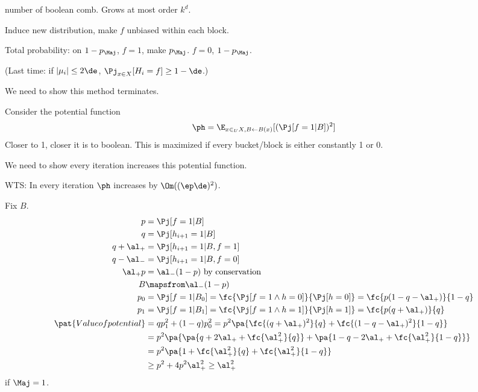number of boolean comb. Grows at most order $k^d$.

Induce new distribution, make $f$ unbiased within each block. 

Total probability: on $1-p_{\Maj}$, $f=1$, make $p_{\Maj}$. $f=0$, $1-p_{\Maj}$.

(Last time: if $|\mu_i|\le 2\de$, $\Pj_{x\in X}[H_i=f]\ge 1-\de$.)

We need to show this method terminates.

Consider the potential function
$$
\ph = \E_{x\in_U X, B\leftarrow B(x)} [(\Pj[f=1|B])^2]
$$
Closer to 1, closer it is to boolean. This is maximized if every bucket/block is either constantly 1 or 0.

We need to show every iteration increases this potential 
function.




WTS: In every iteration $\ph$ increases by $\Om((\ep \de)^2)$. 

Fix $B$. 
\begin{align}
p&=\Pj[f=1|B]\\
q&=\Pj[h_{i+1} = 1|B]\\ %
q+\al_+ &= \Pj[h_{i+1}=1|B, f=1]\\ %
q-\al_- &= \Pj[h_{i+1}=1|B, f=0]\\ %
\al_+p &= \al_-(1-p) \text{ by conservation}\\
B&\mapsfrom \al_-(1-p)\\
p_0&= \Pj[f=1|B_0] = \fc{\Pj[f=1\wedge h=0]}{\Pj[h=0]} = \fc{p(1-q-\al_+)}{1-q}\\
p_1&= \Pj[f=1|B_1] = \fc{\Pj[f=1\wedge h=1]}{\Pj[h=1]} = \fc{p(q+\al_+)}{q}\\
\pat{Value of potential}&=qp_1^2 + (1-q)p_0^2 = p^2 \pa{\fc{(q+\al_+)^2}{q} + \fc{(1-q-\al_+)^2}{1-q}} \\
&=p^2\pa{
\pa{q+2\al_+ + \fc{\al_+^2}{q}}
+
\pa{1-q-2\al_+ + \fc{\al_+^2}{1-q}}
}
\\
&=p^2\pa{1+\fc{\al_+^2}{q} + \fc{\al_+^2}{1-q}}\\
&\ge p^2 + 4p^2 \al_+^2 \ge
 \al_+^2
\end{align}
if $\Maj=1$.


